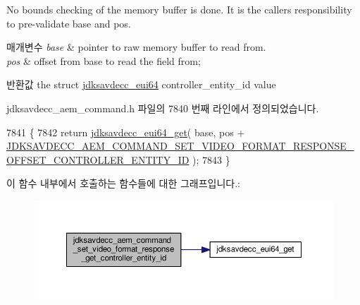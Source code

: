 No bounds checking of the memory buffer is done. It is the caller\textquotesingle{}s responsibility to pre-\/validate base and pos.


\begin{DoxyParams}{매개변수}
{\em base} & pointer to raw memory buffer to read from. \\
\hline
{\em pos} & offset from base to read the field from; \\
\hline
\end{DoxyParams}
\begin{DoxyReturn}{반환값}
the struct \hyperlink{structjdksavdecc__eui64}{jdksavdecc\+\_\+eui64} controller\+\_\+entity\+\_\+id value 
\end{DoxyReturn}


jdksavdecc\+\_\+aem\+\_\+command.\+h 파일의 7840 번째 라인에서 정의되었습니다.


\begin{DoxyCode}
7841 \{
7842     \textcolor{keywordflow}{return} \hyperlink{group__eui64_ga2652311a25a6b91cddbed75c108c7031}{jdksavdecc\_eui64\_get}( base, pos + 
      \hyperlink{group__command__set__video__format__response_ga41f0874b58c46a80b043f0860a6230ec}{JDKSAVDECC\_AEM\_COMMAND\_SET\_VIDEO\_FORMAT\_RESPONSE\_OFFSET\_CONTROLLER\_ENTITY\_ID}
       );
7843 \}
\end{DoxyCode}


이 함수 내부에서 호출하는 함수들에 대한 그래프입니다.\+:
\nopagebreak
\begin{figure}[H]
\begin{center}
\leavevmode
\includegraphics[width=350pt]{group__command__set__video__format__response_gad82eb8678e3b4f1b0a11985396d7473f_cgraph}
\end{center}
\end{figure}


